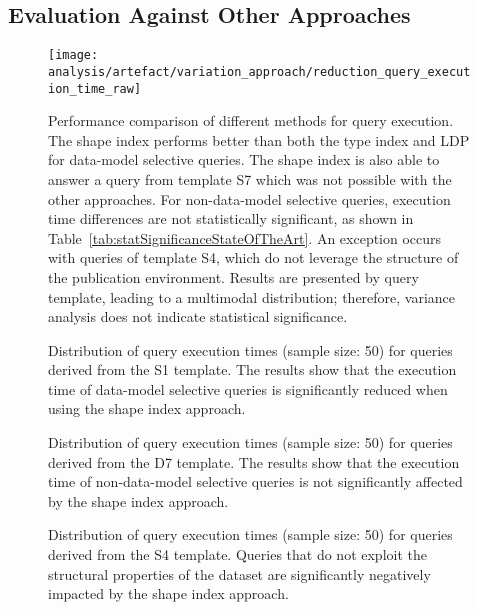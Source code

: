 \subsection{Evaluation Against Other Approaches}

\begin{figure*}
    \centering
     \texttt{[image: analysis/artefact/variation\_approach/reduction\_query\_execution\_time\_raw]}
    \caption{
    Performance comparison of different methods for query execution.
    The shape index performs better than both the type index and LDP for data-model selective queries.
    The shape index is also able to answer a query from template S7 which was not possible with the other approaches.
    For non-data-model selective queries, execution time differences are not statistically significant, as shown in Table~\ref{tab:statSignificanceStateOfTheArt}.
    An exception occurs with queries of template S4, which do not leverage the structure of the publication environment.
    Results are presented by query template, leading to a multimodal distribution; therefore, variance analysis does not indicate statistical significance.
    }
    \label{fig:compApproach}
\end{figure*}

\begin{figure}
    
    \caption{
        Distribution of query execution times (sample size: 50) for queries derived from the S1 template. 
        The results show that the execution time of data-model selective queries is significantly reduced when using the shape index approach.
    }
    \label{fig:violonS1}
\end{figure}


\begin{figure}
    
    \caption{
        Distribution of query execution times (sample size: 50) for queries derived from the D7 template. 
        The results show that the execution time of non-data-model selective queries is not significantly affected by the shape index approach.
    }
    \label{fig:violonD7}
\end{figure}


\begin{figure}
    
    \caption{
        Distribution of query execution times (sample size: 50) for queries derived from the S4 template.
        Queries that do not exploit the structural properties of the dataset are significantly negatively impacted by the shape index approach.
    }
    \label{fig:violonS4}
\end{figure}



